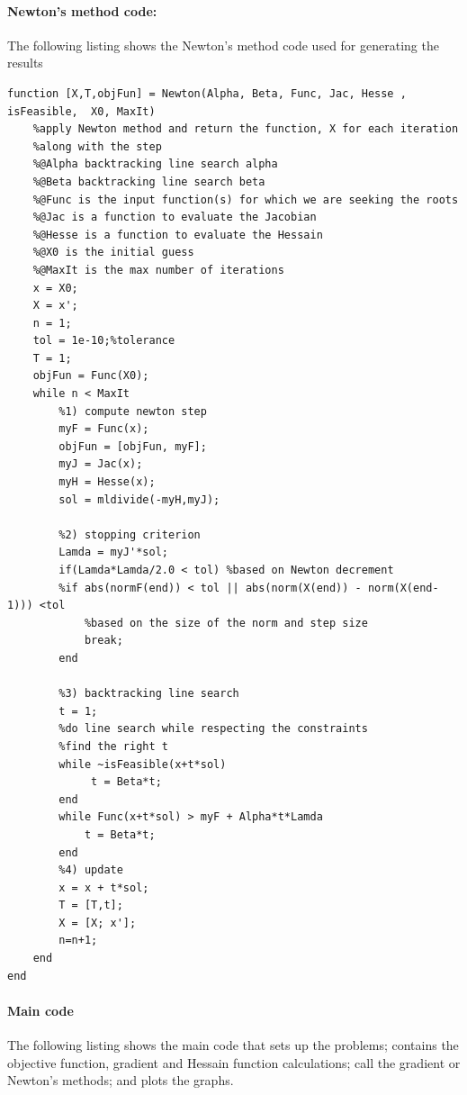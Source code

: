 \documentclass[12pt] {article}
\begin{document}
\paragraph{Newton's method code:}
The following listing shows the Newton's method code used for generating the results 
\begin{lstlisting}
function [X,T,objFun] = Newton(Alpha, Beta, Func, Jac, Hesse , isFeasible,  X0, MaxIt)   
    %apply Newton method and return the function, X for each iteration  
    %along with the step 
    %@Alpha backtracking line search alpha 
    %@Beta backtracking line search beta
    %@Func is the input function(s) for which we are seeking the roots    
    %@Jac is a function to evaluate the Jacobian
    %@Hesse is a function to evaluate the Hessain
    %@X0 is the initial guess     
    %@MaxIt is the max number of iterations     
    x = X0;    
    X = x';
    n = 1;
    tol = 1e-10;%tolerance
    T = 1;
    objFun = Func(X0);
    while n < MaxIt        
        %1) compute newton step         
        myF = Func(x);
        objFun = [objFun, myF];
        myJ = Jac(x);        
        myH = Hesse(x);        
        sol = mldivide(-myH,myJ);

        %2) stopping criterion
        Lamda = myJ'*sol;
        if(Lamda*Lamda/2.0 < tol) %based on Newton decrement
        %if abs(normF(end)) < tol || abs(norm(X(end)) - norm(X(end-1))) <tol
            %based on the size of the norm and step size 
            break;
        end        
        
        %3) backtracking line search
        t = 1;
        %do line search while respecting the constraints 
        %find the right t 
        while ~isFeasible(x+t*sol)
             t = Beta*t;
        end        
        while Func(x+t*sol) > myF + Alpha*t*Lamda
            t = Beta*t;
        end 
        %4) update 
        x = x + t*sol;
        T = [T,t];
        X = [X; x'];
        n=n+1;
    end
end
\end{lstlisting}

\paragraph{Main code}
The following listing shows the main code that sets up the problems; contains the objective function, gradient and Hessain function calculations; call the gradient or Newton's methods; and plots the graphs. 
\end{document}
